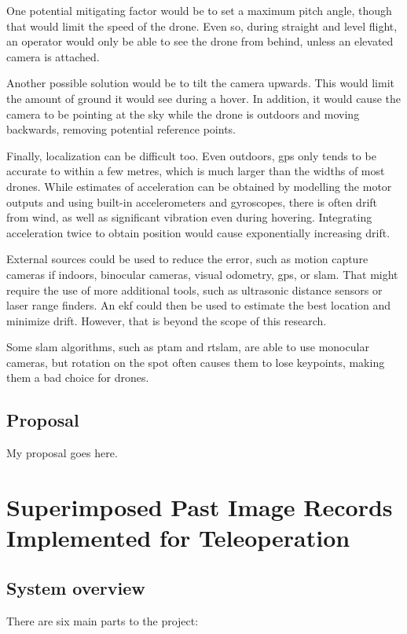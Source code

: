 One potential mitigating factor would be to set a maximum pitch angle, though that would limit the speed of the drone.
Even so, during straight and level flight, an operator would only be able to see the drone from behind, unless an elevated camera is attached.

Another possible solution would be to tilt the camera upwards.
This would limit the amount of ground it would see during a hover.
In addition, it would cause the camera to be pointing at the sky while the drone is outdoors and moving backwards, removing potential reference points.

Finally, localization can be difficult too.
Even outdoors, \gls{gps} only tends to be accurate to within a few metres, which is much larger than the widths of most drones.
While estimates of acceleration can be obtained by modelling the motor outputs and using built-in accelerometers and gyroscopes, there is often drift from wind, as well as significant vibration even during hovering.
Integrating acceleration twice to obtain position would cause exponentially increasing drift.

External sources could be used to reduce the error, such as motion capture cameras if indoors, binocular cameras, visual odometry, \gls{gps}, or \gls{slam}.
That might require the use of more additional tools, such as ultrasonic distance sensors or laser range finders.
An \gls{ekf} could then be used to estimate the best location and minimize drift.
However, that is beyond the scope of this research.

Some \gls{slam} algorithms, such as \gls{ptam} and \gls{rtslam}, are able to use monocular cameras, but rotation on the spot often causes them to lose keypoints, making them a bad choice for drones.

\section{Proposal}
My proposal goes here.

\chapter{Superimposed Past Image Records Implemented for Teleoperation}
\label{ch:spirit}

\section{System overview}
  There are six main parts to the project:

